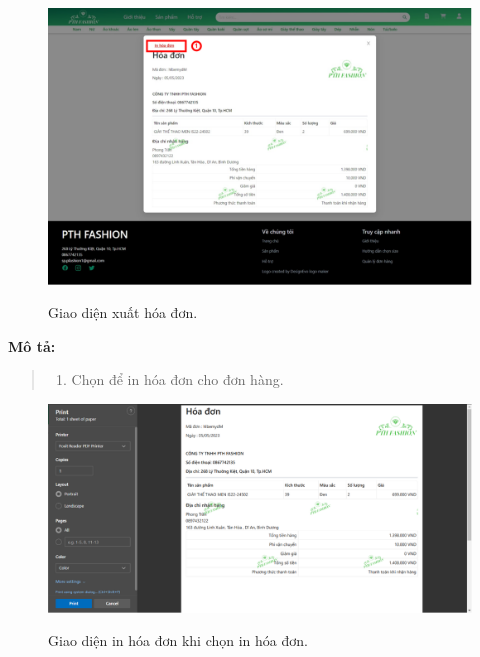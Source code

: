 \begin{figure}[!htp]
    \centering
    \includegraphics[width=5in]{img/UI/new_customer/invoice.png}
    \label{14}
    \newline
    \caption{Giao diện xuất hóa đơn.}
\end{figure}
\textbf{Mô tả:}
\begin{quote}
    \begin{enumerate}
        \item Chọn để in hóa đơn cho đơn hàng.
    \end{enumerate}
\end{quote}
\begin{figure}[!htp]
    \centering
    \includegraphics[width=5in]{img/UI/new_customer/print_invoice.png}
    \label{14}
    \newline
    \caption{Giao diện in hóa đơn khi chọn in hóa đơn.}
\end{figure}

\newpage


